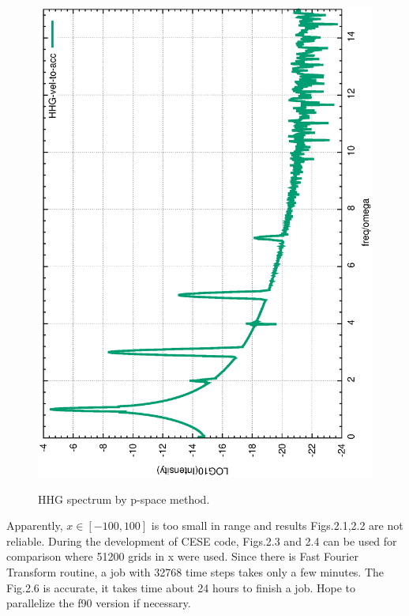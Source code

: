 \documentclass{isildur}
\begin{document}
\begin{itemize}
\begin{figure}[htbp]
{{{\includegraphics[width=\linewidth]{fig3b.eps}} }}
\caption{HHG spectrum by p-space method.
 }
\end{figure}

Apparently, $ x\in[-100,100]$ is too small in range and results Figs.2.1,2.2 are not reliable.
%
During the development of CESE code, Figs.2.3 and 2.4 can be used for comparison where 51200 grids in x were used. Since there is Fast Fourier Transform routine, a job with 32768 time steps takes only a few minutes.
%
The Fig.2.6 is accurate, it takes time about 24 hours to finish a job. Hope to  parallelize the f90 version if necessary. 
\end{itemize}

\clearpage
{}


\end{document}
